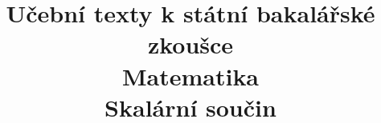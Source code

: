 \clearpage

\clearpage

\title{\LARGE Učební texty k státní bakalářské zkoušce \\ Matematika \\ Skalární součin}



\maketitle

\newpage
\setcounter{section}{9}



